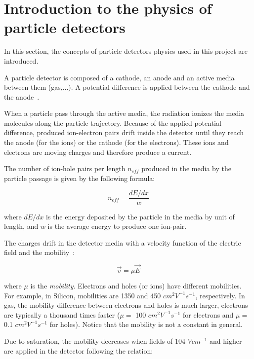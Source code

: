 \documentclass[11pt]{article}
\begin{document}
\section{Introduction to the physics of particle detectors}

	\label{equations}

	In this section, the concepts of particle detectors physics used in this project
	are introduced.

	A particle detector is composed of a cathode, an anode and an active media
	between them (gas,...). A potential difference is applied between the cathode
	and the anode~\cite{lphy2236}.

	When a particle pass through the active media, the radiation ionizes the media
	molecules along the particle trajectory.
	Because of the applied potential difference,
	produced ion-electron pairs drift inside the detector until they reach the anode
	(for the ions) or the cathode (for the electrons). These ions and electrons
	are moving charges and therefore produce a current.

	The number of ion-hole pairs per length $n_{eff}$ produced in the media by the
	particle passage is given by the following formula:

	\[n_{eff} = \frac{dE/dx}{w} \]

	where $dE/dx$ is the energy deposited by the particle in the media by
	unit of length, and $w$ is the average energy to produce one ion-pair.

	The charges drift in the detector media with a velocity function of the electric
	field and the mobility~\cite{spieler2005semiconductor}:

	\begin{equation}
		\vec{v} = \mu \vec{E}
		\label{eq:charge_speed}
	\end{equation}

	where $\mu$ is the \textit{mobility}. Electrons and holes (or ions) have different
	mobilities. For example, in Silicon, mobilities are 1350 and 450 $cm^2V^{-1}s^{-1}$,
	respectively. In gas, the mobility difference between electrons and holes is
	much larger, electrons are typically a thousand times faster ($\mu =$ 100 $cm^2V^{-1}s^{-1}$
	for electrons and $\mu =$ 0.1 $cm^2V^{-1}s^{-1}$ for holes). Notice that the mobility
	is not a constant in general.

	Due to saturation, the mobility decreases when fields of 104 $V cm^{-1}$ and higher are applied in
	the detector following the relation:
\end{document}
